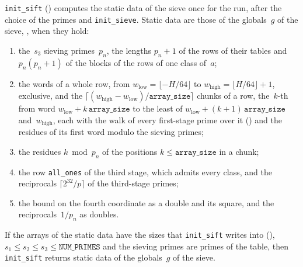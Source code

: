 \begin{definition}\label{def:SiftData.WF}
  \leanok
  \texttt{init\_sift} () computes the static data of the sieve once
  for the run, after the choice of the primes and \texttt{init\_sieve}. Static data are those of
  the globals~$g$ of the sieve, , when they hold:
  \begin{enumerate}
    \item the~$s_3$ sieving primes~$p_n$, the lengths $p_n + 1$ of the rows of their tables and
      $p_n (p_n + 1)$ of the blocks of the rows of one class of~$a$;
    \item the words of a whole row, from $w_{\mathrm{low}} = \lfloor -H/64 \rfloor$ to
      $w_{\mathrm{high}} = \lfloor H/64 \rfloor + 1$, exclusive, and the
      $\lceil (w_{\mathrm{high}} - w_{\mathrm{low}})/\texttt{array\_size} \rceil$ chunks of a row,
      the~$k$-th from word $w_{\mathrm{low}} + k\,\texttt{array\_size}$ to the least of
      $w_{\mathrm{low}} + (k + 1)\,\texttt{array\_size}$ and~$w_{\mathrm{high}}$, each with the
      walk of every first-stage prime over it () and the residues of
      its first word modulo the sieving primes;
    \item the residues $k \bmod p_n$ of the positions $k \le \texttt{array\_size}$ in a chunk;
    \item the row \texttt{all\_ones} of the third stage, which admits every class, and the
      reciprocals $\lceil 2^{32}/p \rceil$ of the third-stage primes;
    \item the bound on the fourth coordinate as a double and its square, and the
      reciprocals~$1/p_n$ as doubles.
  \end{enumerate}
\end{definition}

\begin{lemma}\label{lem:initSift_spec}
  \leanok
  If the arrays of the static data have the sizes that \texttt{init\_sift} writes into
  (), $s_1 \le s_2 \le s_3 \le \texttt{NUM\_PRIMES}$ and the sieving
  primes are primes of the table, then \texttt{init\_sift} returns static data of the globals~$g$
  of the sieve.
\end{lemma}

